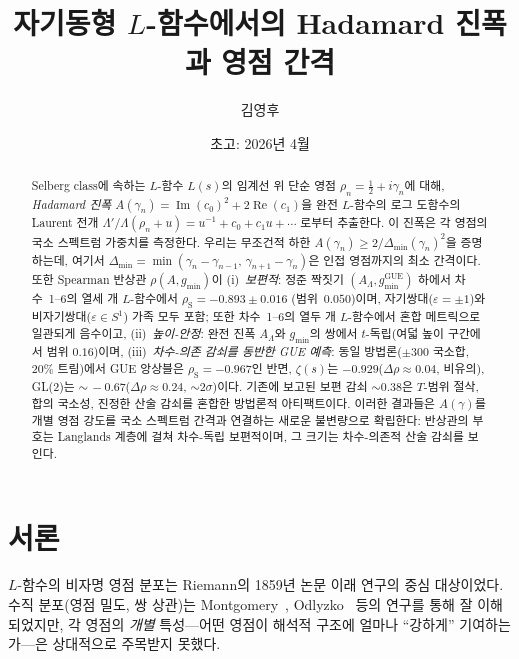 \documentclass[11pt,a4paper]{article}
\title{자기동형 $L$-함수에서의 Hadamard 진폭과 영점 간격}
\author{김영후}
\date{초고: 2026년 4월}
\theoremstyle{plain}
\theoremstyle{definition}
\DeclareMathOperator{\GUE}{GUE}
\newcommand{\La}{\Lambda}
\begin{document}
\maketitle

\begin{abstract}
Selberg class에 속하는 $L$-함수 $L(s)$의 임계선 위 단순 영점
$\rho_n = \tfrac{1}{2} + i\gamma_n$에 대해,
\emph{Hadamard 진폭}
$A(\gamma_n) = \operatorname{Im}(c_0)^2 + 2\operatorname{Re}(c_1)$을
완전 $L$-함수의 로그 도함수의 Laurent 전개
$\La'/\La(\rho_n + u) = u^{-1} + c_0 + c_1 u + \cdots$
로부터 추출한다.
이 진폭은 각 영점의 국소 스펙트럼 가중치를 측정한다.
우리는 무조건적 하한
$A(\gamma_n) \ge 2/\Delta_{\min}(\gamma_n)^2$을 증명하는데,
여기서 $\Delta_{\min} = \min(\gamma_n - \gamma_{n-1},\,\gamma_{n+1} - \gamma_n)$은
인접 영점까지의 최소 간격이다.
또한 Spearman 반상관 $\rho(A, g_{\min})$이
(i)~\emph{보편적}: 정준 짝짓기 $(A_\La, g_{\min}^{\GUE})$ 하에서
차수~1--6의 열세 개 $L$-함수에서
$\rho_{\mathrm{S}} = -0.893 \pm 0.016$ (범위~$0.050$)이며,
자기쌍대($\varepsilon = \pm 1$)와
비자기쌍대($\varepsilon \in S^1$) 가족 모두 포함;
또한 차수~1--6의 열두 개 $L$-함수에서 혼합 메트릭으로
일관되게 음수이고,
(ii)~\emph{높이-안정}: 완전 진폭 $A_\La$와 $g_{\min}$의 쌍에서
$t$-독립(여덟 높이 구간에서 범위 $0.16$)이며,
(iii)~\emph{차수-의존 감쇠를 동반한 GUE 예측}:
동일 방법론($\pm 300$ 국소합, $20\%$ 트림)에서
GUE 앙상블은 $\rho_{\mathrm{S}} = -0.967$인 반면,
$\zeta(s)$는 $-0.929$($\Delta\rho \approx 0.04$, 비유의),
GL(2)는 ${\sim}\,-0.67$($\Delta\rho \approx 0.24$, ${\sim}2\sigma$)이다.
기존에 보고된 보편 감쇠 ${\sim}0.38$은 $T$-범위 절삭,
합의 국소성, 진정한 산술 감쇠를 혼합한 방법론적 아티팩트이다.
이러한 결과들은 $A(\gamma)$를 개별 영점 강도를 국소 스펙트럼 간격과
연결하는 새로운 불변량으로 확립한다:
반상관의 부호는 Langlands 계층에 걸쳐 차수-독립 보편적이며,
그 크기는 차수-의존적 산술 감쇠를 보인다.
\end{abstract}


\section{서론}
\label{sec:intro}

$L$-함수의 비자명 영점 분포는 Riemann의 1859년 논문 이래 연구의 중심 대상이었다.
수직 분포(영점 밀도, 쌍 상관)는 Montgomery~\cite{montgomery1973},
Odlyzko~\cite{odlyzko1987} 등의 연구를 통해 잘 이해되었지만,
각 영점의 \emph{개별} 특성---어떤 영점이 해석적 구조에 얼마나
``강하게'' 기여하는가---은 상대적으로 주목받지 못했다.
\end{document}

